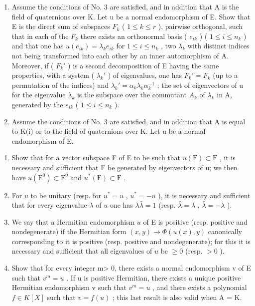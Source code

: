 \begin{enumerate}
\def\labelenumi{\arabic{enumi})}
\setcounter{enumi}{8}
\item
  Assume the conditions of No. 3 are satisfied, and in addition that A is the field of quaternions over K. Let u be a normal endomorphism of E. Show that E is the direct sum of subspaces \(F_{k}\) ( \(1 \leqslant k \leqslant r\) ), pairwise orthogonal, such that in each of the \(F_{k}\) there exists an orthonormal basis ( \(e_{ik}\) ) ( \(1 \leqslant i \leqslant n_{k}\) ) and that one has \(u(e_{ik}) = \lambda_{k}e_{ik}\) for \(1 \leqslant i \leqslant n_{k}\) , two \(\lambda_{k}\) with distinct indices not being transformed into each other by an inner automorphism of A. Moreover, if ( \(F_{k}'\) ) is a second decomposition of E having the same properties, with a system ( \(\lambda_{k}'\) ) of eigenvalues, one has \(F_{k}' = F_{k}\) (up to a permutation of the indices) and \(\lambda_{k}' = \alpha_{k}\lambda_{k}\alpha_{k}^{-1}\) ; the set of eigenvectors of u for the eigenvalue \(\lambda_{k}\) is the subspace over the commutant \(A_{k}\) of \(\lambda_{k}\) in A, generated by the \(e_{ik}\) ( \(1 \leqslant i \leqslant n_{k}\) ).
\item
  Assume the conditions of No. 3 are satisfied, and in addition that A is equal to K(i) or to the field of quaternions over K. Let u be a normal endomorphism of E.
\end{enumerate}

\begin{enumerate}
\def\labelenumi{\alph{enumi})}
\item
  Show that for a vector subspace F of E to be such that \(u(\mathrm{F}) \subset \mathrm{F}\) , it is necessary and sufficient that F be generated by eigenvectors of u; we then have \(u(\mathrm{F}^{0}) \subset \mathrm{F}^{0}\) and \(u^{*}(\mathrm{F}) \subset \mathrm{F}\) .
\item
  For \(u\) to be unitary (resp. for \(u^{*} = u\) , \(u^{*} = -u\) ), it is necessary and sufficient that for every eigenvalue \(\lambda\) of \(u\) one has \(\lambda \bar{\lambda} = 1\) (resp. \(\bar{\lambda} = \lambda\) , \(\bar{\lambda} = -\lambda\) ).
\item
  We say that a Hermitian endomorphism \(u\) of E is positive (resp. positive and nondegenerate) if the Hermitian form \((x, y) \to \Phi(u(x), y)\) canonically corresponding to it is positive (resp. positive and nondegenerate); for this it is necessary and sufficient that all eigenvalues of \(u\) be \(\geqslant 0\) (resp. \(>0\) ).
\item
  Show that for every integer m\textgreater{} 0, there exists a normal endomorphism v of E such that \(v^{m}=u\) . If u is positive Hermitian, there exists a unique positive Hermitian endomorphism v such that \(v^{m}=u\) , and there exists a polynomial \(f\in K[X]\) such that \(v=f(u)\) ; this last result is also valid when A = K.
\end{enumerate}

